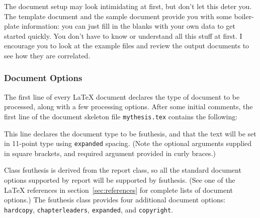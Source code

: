 \documentclass[11pt,letterpaper]{ltxdockit}[2011/03/25]
\newcommand*{\complit}[1]{\texttt{#1}}
\newcommand*{\pkg}[1]{\textsf{#1}}
\newcommand*{\fsuth}{\pkg{fsuthesis}}
\renewcommand{\-}{\discretionary{}{}{}}
\begin{document}
The document setup may look intimidating at first, but don't let this
deter you.  The template document and the sample document provide you
with some boiler-plate information: you can just fill in the blanks
with your own data to get started quickly.  You don't have to know or
understand all this stuff at first.  I encourage you to look at the
example files and review the output documents to see how they are
correlated.

\subsubsection{Document Options}
\label{sec:docoptions}
The first line of every \LaTeX{} document declares the type of
document to be processed, along with a few processing options.  After
some initial comments, the first line of the document skeleton file
\complit{mythesis.tex} contains the
following:
This line declares the document type to be \fsuth, and that the text
will be set in 11-point type using \verb|expanded| spacing. (Note the
optional arguments supplied in square brackets, and required argument
provided in curly braces.)

Class \fsuth{} is derived from the \pkg{report} class, so all
the standard document options supported by \pkg{report} will be
supported by \fsuth.  (See one of the \LaTeX{} references in
section~\ref{sec:references} for complete lists of document options.)
The \fsuth{} class provides four additional document options:
\complit{hardcopy}, \complit{chapterleaders}, \complit{expanded}, and
\complit{copyright}.
\end{document}
